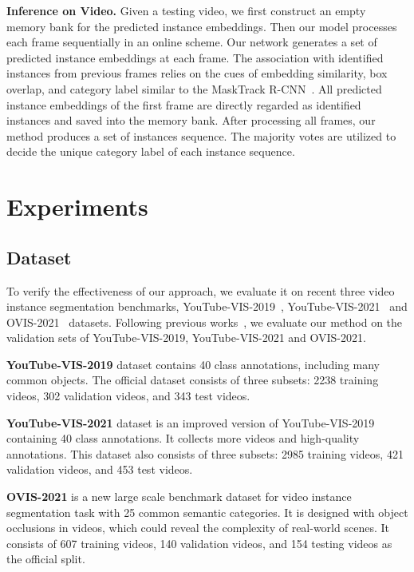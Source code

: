 \documentclass[runningheads]{llncs}
\begin{document}
\noindent \textbf{Inference on Video.} Given a testing video, we first construct an empty memory bank for the predicted instance embeddings. Then our model processes each frame sequentially in an online scheme. Our network generates a set of predicted instance embeddings at each frame. The association with identified instances from previous frames relies on the cues of embedding similarity, box overlap, and category label similar to the MaskTrack R-CNN~\cite{yang2019video}. All predicted instance embeddings of the first frame are directly regarded as identified instances and saved into the memory bank. After processing all frames, our method produces a set of instances sequence. The majority votes are utilized to decide the unique category label of each instance sequence. \section{Experiments}

\subsection{Dataset}
To verify the effectiveness of our approach, we evaluate it on recent three video instance segmentation benchmarks, YouTube-VIS-2019~\cite{yang2019video}, YouTube-VIS-2021~\cite{YouTube-VIS-2021} and OVIS-2021~\cite{qi2021occluded} datasets. Following previous works~\cite{yang2019video,bertasius2020classifying,yang2021crossover}, we evaluate our method on the validation sets of YouTube-VIS-2019, YouTube-VIS-2021 and OVIS-2021. 

\noindent \textbf{YouTube-VIS-2019} dataset contains 40 class annotations, including many common objects. The official dataset consists of three subsets: 2238 training videos, 302 validation videos, and 343 test videos.


\noindent \textbf{YouTube-VIS-2021} dataset is an improved version of YouTube-VIS-2019 containing 40 class annotations. It collects more videos and high-quality annotations. This dataset also consists of three subsets: 2985 training videos, 421 validation videos, and 453 test videos. 

\noindent \textbf{OVIS-2021} is a new large scale benchmark dataset for video instance segmentation task with 25 common semantic categories. It is designed with object occlusions in videos, which could reveal the complexity of real-world scenes. It consists of 607 training videos, 140 validation videos, and 154 testing videos as the official split.
\end{document}
